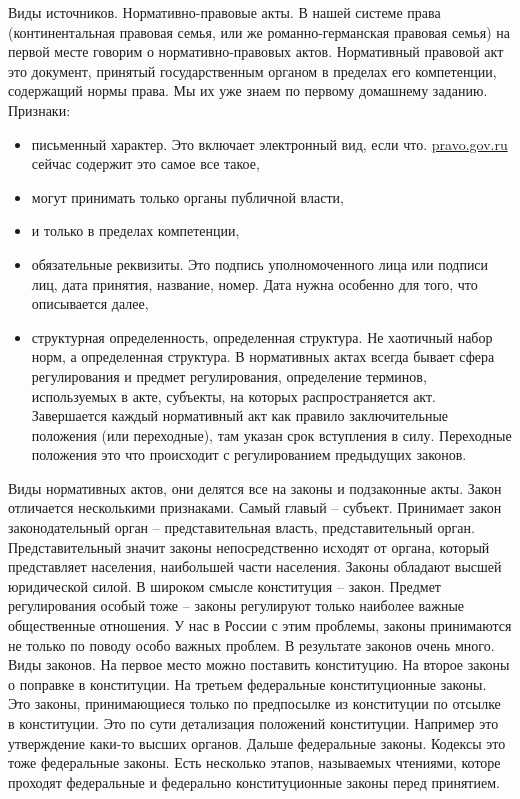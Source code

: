 \documentclass[a4paper, 12pt]{article}
\begin{document}
Виды источников. Нормативно-правовые акты. В нашей системе права (континентальная правовая семья, или же романно-германская правовая семья) на первой месте говорим о нормативно-правовых актов. Нормативный правовой акт это документ, принятый государственным органом в пределах его компетенции, содержащий нормы права. Мы их уже знаем по первому домашнему заданию. Признаки: 
\begin{itemize}
\item письменный характер. Это включает электронный вид, если что. \href{http://pravo.gov.ru}{pravo.gov.ru} сейчас содержит это самое все такое,
\item могут принимать только органы публичной власти,
\item и только в пределах компетенции,
\item обязательные реквизиты. Это подпись уполномоченного лица или подписи лиц, дата принятия, название, номер. Дата нужна особенно для того, что описывается далее, 
\item структурная определенность, определенная структура. Не хаотичный набор норм, а определенная структура. В нормативных актах всегда бывает сфера регулирования и предмет регулирования, определение терминов, используемых в акте, субъекты, на которых распространяется акт. Завершается каждый нормативный акт как правило заключительные положения (или переходные), там указан срок вступления в силу. Переходные положения это что происходит с регулированием предыдущих законов. 
\end{itemize}

Виды нормативных актов, они делятся все на законы и подзаконные акты. Закон отличается несколькими признаками. Самый главый -- субъект. Принимает закон законодательный орган -- представительная власть, представительный орган. Представительный значит законы непосредственно исходят от органа, который представляет населения, наибольшей части населения. Законы обладают высшей юридической силой. В широком смысле конституция -- закон. Предмет регулирования особый тоже -- законы регулируют только наиболее важные общественные отношения. У нас в России с этим проблемы, законы принимаются не только по поводу особо важных проблем. В результате законов очень много. Виды законов. На первое место можно поставить конституцию. На второе законы о поправке в конституции. На третьем федеральные конституционные законы. Это законы, принимающиеся только по предпосылке из конституции по отсылке в конституции. Это по сути детализация положений конституции. Например это утверждение каки-то высших органов. Дальше федеральные законы. Кодексы это тоже федеральные законы. Есть несколько этапов, называемых чтениями, которе проходят федеральные и федерально конституционные законы перед принятием. 
\end{document}
